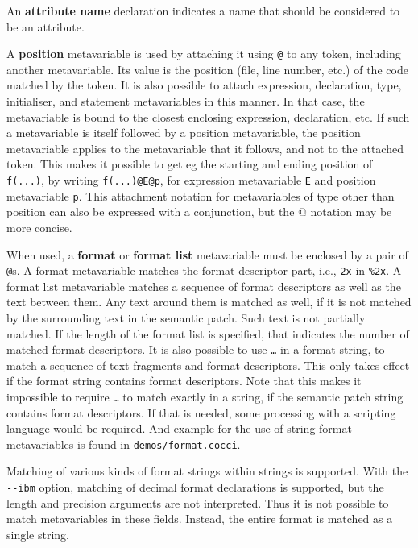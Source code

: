 An {\bf attribute name} declaration indicates a name that should be
considered to be an attribute.

A {\bf position} metavariable is used by attaching it using \texttt{@} to
any token, including another metavariable.  Its value is the position
(file, line number, etc.) of the code matched by the token.  It is also
possible to attach expression, declaration, type, initialiser, and
statement metavariables in this manner.  In that case, the metavariable is
bound to the closest enclosing expression, declaration, etc.  If such a
metavariable is itself followed by a position metavariable, the position
metavariable applies to the metavariable that it follows, and not to the
attached token.  This makes it possible to get eg the starting and ending
position of {\tt f(...)}, by writing {\tt f(...)@E@p}, for expression
metavariable {\tt E} and position metavariable {\tt p}. This attachment
notation for metavariables of type other than position can also be
expressed with a conjunction, but the @ notation may be more concise.

When used, a {\bf format} or {\bf format list} metavariable must be
enclosed by a pair of \texttt{@}s.  A format metavariable matches the
format descriptor part, i.e., \texttt{2x} in \texttt{\%2x}.  A format list
metavariable matches a sequence of format descriptors as well as the text
between them.  Any text around them is matched as well, if it is not
matched by the surrounding text in the semantic patch.  Such text is not
partially matched.  If the length of the format list is specified, that
indicates the number of matched format descriptors.  It is also possible to
use \texttt{\ldots} in a format string, to match a sequence of text
fragments and format descriptors.  This only takes effect if the format
string contains format descriptors.  Note that this makes it impossible to
require \texttt{\ldots} to match exactly in a string, if the semantic patch
string contains format descriptors.  If that is needed, some processing
with a scripting language would be required.  And example for the use of
string format metavariables is found in {\tt demos/format.cocci}.

Matching of various kinds of format strings within strings is supported.
With the {\tt -{}-ibm} option, matching of decimal format declarations is
supported, but the length and precision arguments are not interpreted.
Thus it is not possible to match metavariables in these fields.  Instead,
the entire format is matched as a single string.

